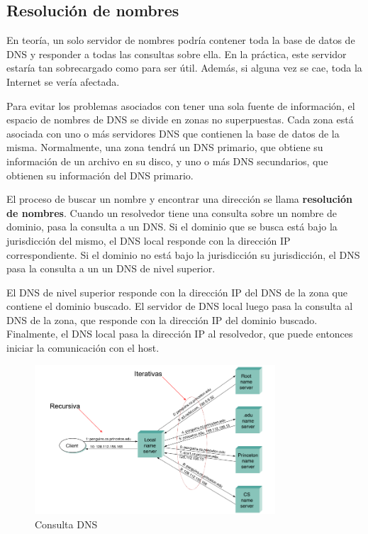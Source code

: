 \subsection{Resolución de nombres}
En teoría, un solo servidor de nombres podría contener toda la base de datos de DNS y responder a todas las consultas sobre ella. En la práctica, este servidor estaría tan sobrecargado como para ser útil. Además, si alguna vez se cae, toda la Internet se vería afectada.

Para evitar los problemas asociados con tener una sola fuente de información, el espacio de nombres de DNS se divide en zonas no superpuestas. Cada zona está asociada con uno o más servidores DNS que contienen la base de datos de la misma. Normalmente, una zona tendrá un DNS primario, que obtiene su información de un archivo en su disco, y uno o más DNS secundarios, que obtienen su información del DNS primario. 

El proceso de buscar un nombre y encontrar una dirección se llama \textbf{resolución de nombres}. Cuando un resolvedor tiene una consulta sobre un nombre de dominio, pasa la consulta a un DNS. Si el dominio que se busca está bajo la jurisdicción del mismo, el DNS local responde con la dirección IP correspondiente. Si el dominio no está bajo la jurisdicción su jurisdicción, el DNS pasa la consulta a un un DNS de nivel superior.

El DNS de nivel superior responde con la dirección IP del DNS de la zona que contiene el dominio buscado. El servidor de DNS local luego pasa la consulta al DNS de la zona, que responde con la dirección IP del dominio buscado. Finalmente, el DNS local pasa la dirección IP al resolvedor, que puede entonces iniciar la comunicación con el host.

\begin{figure}[H]
	\centering
	\includegraphics[width=0.8\textwidth
]{images/dns-queries.png}
	\caption[Consulta DNS]{Consulta DNS}
	\label{fig:dns-queries}
\end{figure}

